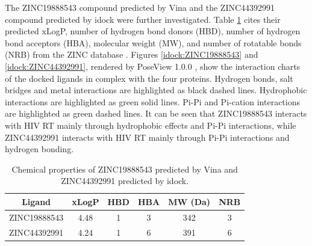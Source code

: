 The ZINC19888543 compound predicted by Vina and the ZINC44392991 compound predicted by idock were further investigated. Table \ref{idock:ZINC19888543-ZINC44392991} cites their predicted xLogP, number of hydrogen bond donors (HBD), number of hydrogen bond acceptors (HBA), molecular weight (MW), and number of rotatable bonds (NRB) from the ZINC database \citep{532,1178}. Figures \ref{idock:ZINC19888543} and \ref{idock:ZINC44392991}, rendered by PoseView 1.0.0 \citep{748}, show the interaction charts of the docked ligands in complex with the four proteins. Hydrogen bonds, salt bridges and metal interactions are highlighted as black dashed lines. Hydrophobic interactions are highlighted as green solid lines. Pi-Pi and Pi-cation interactions are highlighted as green dashed lines. It can be seen that ZINC19888543 interacts with HIV RT mainly through hydrophobic effects and Pi-Pi interactions, while ZINC44392991 interacts with HIV RT mainly through Pi-Pi interactions and hydrogen bonding.

\begin{table}
\centering
\begin{tabular*}
{\linewidth}
{@{\extracolsep{\fill}}cccccc}
\toprule
Ligand & xLogP & HBD & HBA & MW (Da) & NRB\\
\midrule
ZINC19888543 & 4.48 & 1 & 3 & 342 & 3\\
ZINC44392991 & 4.24 & 1 & 6 & 391 & 6\\
\bottomrule
\end{tabular*}
\caption{Chemical properties of ZINC19888543 predicted by Vina and ZINC44392991 predicted by idock.}
\label{idock:ZINC19888543-ZINC44392991}
\end{table}

